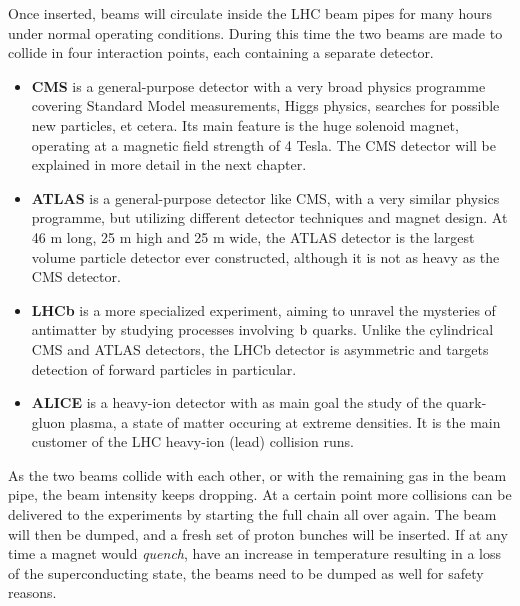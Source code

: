 Once inserted, beams will circulate inside the LHC beam pipes for many hours under
normal operating conditions. During this time the two beams are made to collide in four interaction
points, each containing a separate detector. 
\begin{itemize}
  \item \textbf{CMS} is a general-purpose detector with a very broad physics programme covering
Standard Model measurements, Higgs physics, searches for possible new particles, et cetera. Its
main feature is the huge solenoid magnet, operating at a magnetic field strength of 4 Tesla. The
CMS detector will be explained in more detail in the next chapter. 
  \item \textbf{ATLAS} is a general-purpose detector like CMS, with a very similar physics
programme, but utilizing different detector techniques and magnet design. At 46 m long, 25 m high
and 25 m wide, the ATLAS detector is the largest volume particle detector ever
constructed, although it is not as heavy as the CMS detector. 
  \item \textbf{LHCb} is a more specialized experiment, aiming to unravel the mysteries of
antimatter by studying processes involving $\mathrm{b}$ quarks. Unlike the cylindrical CMS and ATLAS
detectors, the LHCb detector is asymmetric and targets detection of forward particles in particular.
  \item \textbf{ALICE} is a heavy-ion detector with as main goal the study of the quark-gluon
plasma, a state of matter occuring at extreme densities. It is the main customer of the LHC
heavy-ion (lead) collision runs.
\end{itemize}
As the two beams collide with each other, or with the remaining gas in the beam pipe, the beam
intensity keeps dropping. At a certain point more collisions can be delivered to the experiments by
starting the full chain all over again. The beam will then be dumped, and a fresh set of proton
bunches will be inserted. 
If at any time a magnet would \textit{quench}, have an increase in temperature resulting in a loss
of the superconducting state, the beams need to be dumped as well for safety reasons.  

